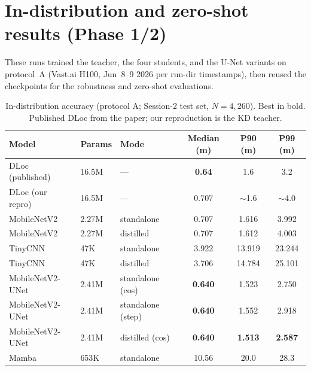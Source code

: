 \documentclass[11pt]{article}
\newcommand{\best}[1]{\textbf{#1}}
\begin{document}
\section{In-distribution and zero-shot results (Phase 1/2)}
\label{sec:indist}
These runs trained the teacher, the four students, and the U-Net variants on
protocol~A (Vast.ai H100, Jun~8--9 2026 per run-dir timestamps), then reused the
checkpoints for the robustness and zero-shot evaluations.

\begin{table}[h]
\centering
\caption{In-distribution accuracy (protocol A; Session-2 test set, $N=4{,}260$).
Best in bold. Published DLoc from the paper; our reproduction is the KD teacher.}
\begin{tabular}{lllccc}
\toprule
Model & Params & Mode & Median (m) & P90 (m) & P99 (m) \\
\midrule
DLoc (published)   & 16.5M & ---               & \best{0.64}  & 1.6   & 3.2 \\
DLoc (our repro)   & 16.5M & ---               & 0.707        & $\sim$1.6 & $\sim$4.0 \\
MobileNetV2        & 2.27M & standalone        & 0.707        & 1.616 & 3.992 \\
MobileNetV2        & 2.27M & distilled         & 0.707        & 1.612 & 4.003 \\
TinyCNN            & 47K   & standalone        & 3.922        & 13.919 & 23.244 \\
TinyCNN            & 47K   & distilled         & 3.706        & 14.784 & 25.101 \\
MobileNetV2-UNet   & 2.41M & standalone (cos)  & \best{0.640} & 1.523 & 2.750 \\
MobileNetV2-UNet   & 2.41M & standalone (step) & \best{0.640} & 1.552 & 2.918 \\
MobileNetV2-UNet   & 2.41M & distilled (cos)   & \best{0.640} & \best{1.513} & \best{2.587} \\
Mamba              & 653K  & standalone        & 10.56        & 20.0  & 28.3 \\
\bottomrule
\end{tabular}
\end{table}
\end{document}
